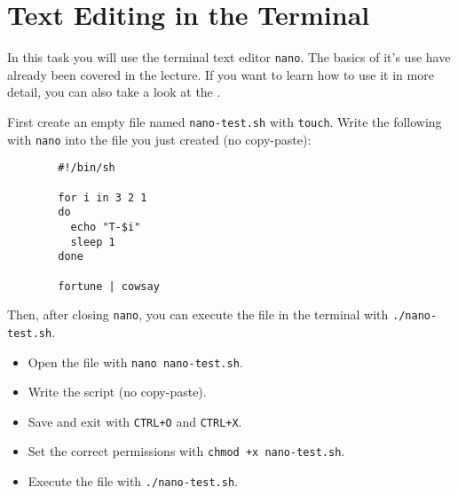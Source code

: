 \documentclass[english]{sheet}
\begin{document}
\section{Text Editing in the Terminal}

\begin{exercise}[subtitle=\texttt{Nano}]
    In this task you will use the terminal text editor \texttt{nano}. The basics of it's use have already been covered in the lecture. If you want to learn how to use it in more detail, you can also take a look at the .

    First create an empty file named \texttt{nano-test.sh} with \texttt{touch}. Write the following with \texttt{nano} into the file you just created (no copy-paste):

    \begin{verbatim}
        #!/bin/sh

        for i in 3 2 1
        do
          echo "T-$i"
          sleep 1
        done

        fortune | cowsay
    \end{verbatim}

    Then, after closing \texttt{nano}, you can execute the file in the terminal with \texttt{./nano-test.sh}.
\end{exercise}

\begin{solution}
    \begin{itemize}
        \item Open the file with \texttt{nano nano-test.sh}.
        \item Write the script (no copy-paste).
        \item Save and exit with \texttt{CTRL+O} and \texttt{CTRL+X}.
        \item Set the correct permissions with \texttt{chmod +x nano-test.sh}.
        \item Execute the file with \texttt{./nano-test.sh}.
    \end{itemize}
\end{solution}
\end{document}
